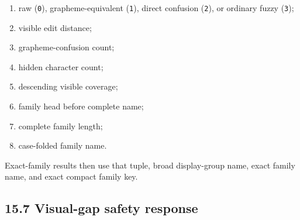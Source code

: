 \begin{enumerate}
\def\labelenumi{\arabic{enumi}.}
\tightlist
\item
  raw (\texttt{0}), grapheme-equivalent (\texttt{1}), direct confusion (\texttt{2}), or ordinary fuzzy (\texttt{3});
\item
  visible edit distance;
\item
  grapheme-confusion count;
\item
  hidden character count;
\item
  descending visible coverage;
\item
  family head before complete name;
\item
  complete family length;
\item
  case-folded family name.
\end{enumerate}

Exact-family results then use that tuple, broad display-group name, exact family name, and exact compact family key.

\subsection{15.7 Visual-gap safety response}\label{157-visual-gap-safety-response}


